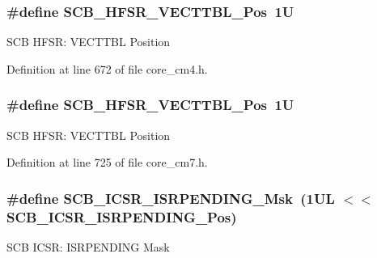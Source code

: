 \subsubsection[{\texorpdfstring{S\+C\+B\+\_\+\+H\+F\+S\+R\+\_\+\+V\+E\+C\+T\+T\+B\+L\+\_\+\+Pos}{SCB_HFSR_VECTTBL_Pos}}]{\setlength{\rightskip}{0pt plus 5cm}\#define S\+C\+B\+\_\+\+H\+F\+S\+R\+\_\+\+V\+E\+C\+T\+T\+B\+L\+\_\+\+Pos~1U}\hypertarget{group___c_m_s_i_s___s_c_b_ga77993da8de35adea7bda6a4475f036ab}{}\label{group___c_m_s_i_s___s_c_b_ga77993da8de35adea7bda6a4475f036ab}
S\+CB H\+F\+SR\+: V\+E\+C\+T\+T\+BL Position 

Definition at line 672 of file core\+\_\+cm4.\+h.

\subsubsection[{\texorpdfstring{S\+C\+B\+\_\+\+H\+F\+S\+R\+\_\+\+V\+E\+C\+T\+T\+B\+L\+\_\+\+Pos}{SCB_HFSR_VECTTBL_Pos}}]{\setlength{\rightskip}{0pt plus 5cm}\#define S\+C\+B\+\_\+\+H\+F\+S\+R\+\_\+\+V\+E\+C\+T\+T\+B\+L\+\_\+\+Pos~1U}\hypertarget{group___c_m_s_i_s___s_c_b_ga77993da8de35adea7bda6a4475f036ab}{}\label{group___c_m_s_i_s___s_c_b_ga77993da8de35adea7bda6a4475f036ab}
S\+CB H\+F\+SR\+: V\+E\+C\+T\+T\+BL Position 

Definition at line 725 of file core\+\_\+cm7.\+h.

\subsubsection[{\texorpdfstring{S\+C\+B\+\_\+\+I\+C\+S\+R\+\_\+\+I\+S\+R\+P\+E\+N\+D\+I\+N\+G\+\_\+\+Msk}{SCB_ICSR_ISRPENDING_Msk}}]{\setlength{\rightskip}{0pt plus 5cm}\#define S\+C\+B\+\_\+\+I\+C\+S\+R\+\_\+\+I\+S\+R\+P\+E\+N\+D\+I\+N\+G\+\_\+\+Msk~(1\+U\+L $<$$<$ S\+C\+B\+\_\+\+I\+C\+S\+R\+\_\+\+I\+S\+R\+P\+E\+N\+D\+I\+N\+G\+\_\+\+Pos)}\hypertarget{group___c_m_s_i_s___s_c_b_ga056d74fd538e5d36d3be1f28d399c877}{}\label{group___c_m_s_i_s___s_c_b_ga056d74fd538e5d36d3be1f28d399c877}
S\+CB I\+C\+SR\+: I\+S\+R\+P\+E\+N\+D\+I\+NG Mask 

